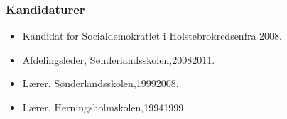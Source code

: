 \documentclass[11pt, a4paper]{awesome-cv}
\begin{document}
\begin{cvletter}
\subsubsection*{Kandidaturer}
\begin{itemize}
\item Kandidat for Socialdemokratiet i Holstebrokredsenfra 2008.
\end{itemize}
\begin{itemize}
\item Afdelingsleder, Sønderlandsskolen,20082011.
\item Lærer, Sønderlandsskolen,19992008.
\item Lærer, Herningsholmskolen,19941999.
\end{itemize}
\end{cvletter}
\end{document}
